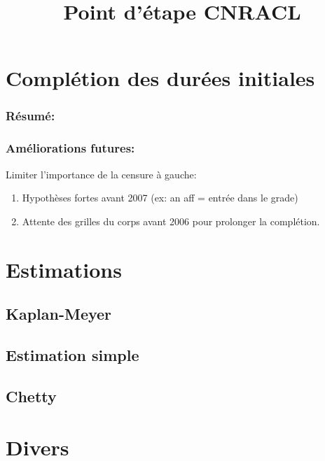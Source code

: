 \documentclass[11pt,a4paper]{article}
\begin{document}
\title{Point d'étape CNRACL}


\maketitle

\section{Complétion des durées initiales}

\subsubsection*{Résumé:}



\subsubsection*{Améliorations futures:}

Limiter l'importance de la censure à gauche: 
\begin{enumerate}
\item Hypothèses fortes avant 2007 (ex: an aff = entrée dans le grade)
\item Attente des grilles du corps avant 2006 pour prolonger la complétion. 
\end{enumerate}




\section{Estimations}

\subsection{Kaplan-Meyer}

\subsection{Estimation simple}

\subsection{Chetty}

\section{Divers}
\end{document}
